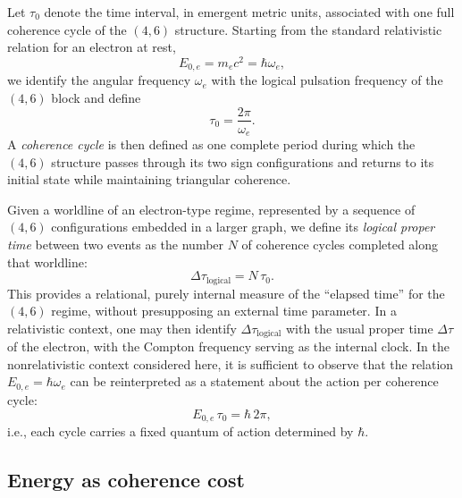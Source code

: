 \documentclass[11pt,a4paper]{article}
\begin{document}
Let $\tau_{0}$ denote the time interval, in emergent metric units, associated with one full coherence cycle of the $(4,6)$ structure. Starting from the standard relativistic relation for an electron at rest,
\begin{equation}
E_{0,e} = m_e c^{2} = \hbar \omega_e,
\end{equation}
we identify the angular frequency $\omega_e$ with the logical pulsation frequency of the $(4,6)$ block and define
\begin{equation}
\tau_{0} = \frac{2\pi}{\omega_e}.
\end{equation}
A \emph{coherence cycle} is then defined as one complete period during which the $(4,6)$ structure passes through its two sign configurations and returns to its initial state while maintaining triangular coherence.\par

Given a worldline of an electron-type regime, represented by a sequence of $(4,6)$ configurations embedded in a larger graph, we define its \emph{logical proper time} between two events as the number $N$ of coherence cycles completed along that worldline:
\begin{equation}
\Delta \tau_{\mathrm{logical}} = N\,\tau_{0}.
\end{equation}
This provides a relational, purely internal measure of the ``elapsed time'' for the $(4,6)$ regime, without presupposing an external time parameter. In a relativistic context, one may then identify $\Delta \tau_{\mathrm{logical}}$ with the usual proper time $\Delta \tau$ of the electron, with the Compton frequency serving as the internal clock.\cite{Laubscher2026LDP_French} In the nonrelativistic context considered here, it is sufficient to observe that the relation $E_{0,e} = \hbar \omega_e$ can be reinterpreted as a statement about the action per coherence cycle:
\begin{equation}
E_{0,e} \,\tau_{0} = \hbar \, 2\pi,
\end{equation}
i.e., each cycle carries a fixed quantum of action determined by $\hbar$.

\subsection{Energy as coherence cost}
\end{document}
